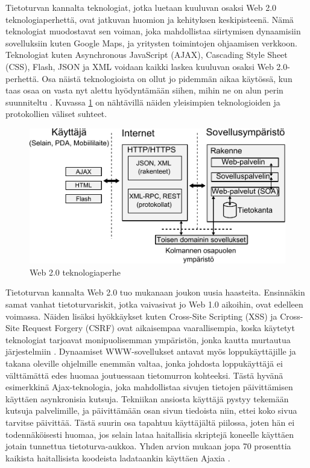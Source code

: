 Tietoturvan kannalta teknologiat, jotka luetaan kuuluvan osaksi Web 2.0
teknologiaperhettä, ovat jatkuvan huomion ja kehityksen keskipisteenä. Nämä teknologiat
muodostavat sen voiman, joka mahdollistaa siirtymisen dynaamisiin
sovelluksiin kuten Google Maps, ja yritysten toimintojen ohjaamisen verkkoon.
Teknologiat kuten Asynchronous JavaScript (AJAX), Cascading Style Sheet (CSS),
Flash, JSON ja XML voidaan kaikki laskea kuuluvan osaksi Web 2.0-perhettä.
Osa näistä teknologioista on ollut jo pidemmän aikaa käytössä, kun taas osaa on
vasta nyt alettu hyödyntämään siihen, mihin ne on alun perin suunniteltu \cite{WEB2}.
Kuvassa \ref{web} on nähtävillä näiden yleisimpien teknologioiden ja protokollien
väliset suhteet.

\begin{figure}[htp]
\centering
\includegraphics[width=12cm]{pics/web_ymparisto.pdf}
\caption{Web 2.0 teknologiaperhe}
\label{web}
\end{figure}

Tietoturvan kannalta Web 2.0 tuo mukanaan joukon uusia haasteita. Ensinnäkin
samat vanhat tietoturvariskit, jotka vaivasivat jo Web 1.0 aikoihin, ovat edelleen voimassa. Näiden lisäksi
hyökkäykset kuten Cross-Site Scripting (XSS) ja Cross-Site Request Forgery (CSRF) 
ovat aikaisempaa vaarallisempia, koska käytetyt teknologiat tarjoavat
monipuolisemman ympäristön, jonka kautta murtautua järjestelmiin \cite{WEB2}. Dynaamiset
WWW-sovellukset antavat myös loppukäyttäjille ja takana oleville ohjelmille enemmän
valtaa, jonka johdosta loppukäyttäjä ei välttämättä edes huomaa joutuessaan
tietomurron kohteeksi. Tästä hyvänä esimerkkinä Ajax-teknologia, joka mahdollistaa
sivujen tietojen päivittämisen käyttäen asynkronisia kutsuja. Tekniikan ansiosta
käyttäjä pystyy tekemään kutsuja palvelimille, ja päivittämään osan sivun
tiedoista niin, ettei koko sivua tarvitse päivittää. Tästä suurin osa tapahtuu
käyttäjältä piilossa, joten hän ei todennäköisesti huomaa, jos selain lataa
haitallisia skriptejä koneelle käyttäen jotain tunnettua tietoturva-aukkoa. Yhden
arvion mukaan jopa 70 prosenttia kaikista haitallisista koodeista ladataankin käyttäen
Ajaxia \cite{WEB2c}.

